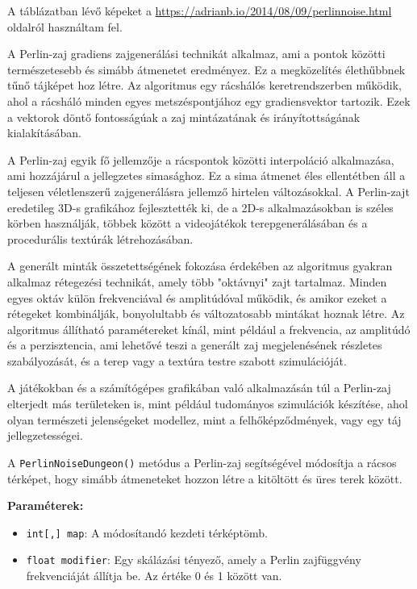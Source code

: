 A táblázatban lévő képeket a \url{https://adrianb.io/2014/08/09/perlinnoise.html} oldalról használtam fel.

A Perlin-zaj gradiens zajgenerálási technikát alkalmaz, ami a pontok közötti természetesebb és simább átmenetet eredményez. Ez a megközelítés élethűbbnek tűnő tájképet hoz létre. Az algoritmus egy rácshálós keretrendszerben működik, ahol a rácsháló minden egyes metszéspontjához egy gradiensvektor tartozik. Ezek a vektorok döntő fontosságúak a zaj mintázatának és irányítottságának kialakításában.\cite{perlin2}

A Perlin-zaj egyik fő jellemzője a rácspontok közötti interpoláció alkalmazása, ami hozzájárul a jellegzetes simasághoz. Ez a sima átmenet éles ellentétben áll a teljesen véletlenszerű zajgenerálásra jellemző hirtelen változásokkal. A Perlin-zajt eredetileg 3D-s grafikához fejlesztették ki, de a 2D-s alkalmazásokban is széles körben használják, többek között a videojátékok terepgenerálásában és a procedurális textúrák létrehozásában.\cite{perlin2}

A generált minták összetettségének fokozása érdekében az algoritmus gyakran alkalmaz rétegezési technikát, amely több "oktávnyi" zajt tartalmaz. Minden egyes oktáv külön frekvenciával és amplitúdóval működik, és amikor ezeket a rétegeket kombinálják, bonyolultabb és változatosabb mintákat hoznak létre. Az algoritmus állítható paramétereket kínál, mint például a frekvencia, az amplitúdó és a perzisztencia, ami lehetővé teszi a generált zaj megjelenésének részletes szabályozását, és a terep vagy a textúra testre szabott szimulációját.\cite{perlin2}

A játékokban és a számítógépes grafikában való alkalmazásán túl a Perlin-zaj elterjedt más területeken is, mint például tudományos szimulációk készítése, ahol olyan természeti jelenségeket modellez, mint a felhőképződmények, vagy egy táj jellegzetességei.\cite{perlin2}


A \texttt{PerlinNoiseDungeon()} metódus a Perlin-zaj segítségével módosítja a rácsos térképet, hogy simább átmeneteket hozzon létre a kitöltött és üres terek között.

\textbf{Paraméterek:}
\begin{itemize}
\item \texttt{int[,] map}: A módosítandó kezdeti térképtömb.
\item \texttt{float modifier}: Egy skálázási tényező, amely a Perlin zajfüggvény frekvenciáját állítja be. Az értéke 0 és 1 között van.
\end{itemize}

